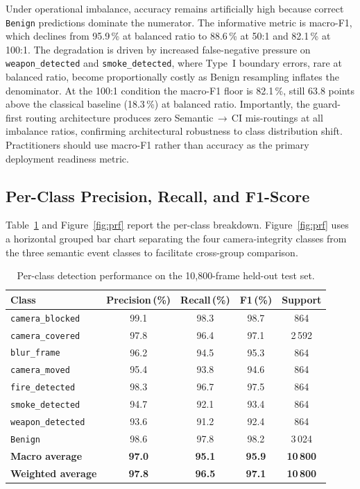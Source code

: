 \documentclass[sensors,article,submit,pdftex,moreauthors]{Definitions/mdpi}
\begin{document}
Under operational imbalance, accuracy remains artificially high because correct \texttt{Benign} predictions dominate the numerator. The informative metric is macro-F1, which declines from 95.9\,\% at balanced ratio to 88.6\,\% at 50:1 and 82.1\,\% at 100:1. The degradation is driven by increased false-negative pressure on \texttt{weapon\_detected} and \texttt{smoke\_detected}, where Type~I boundary errors, rare at balanced ratio, become proportionally costly as Benign resampling inflates the denominator. At the 100:1 condition the macro-F1 floor is 82.1\,\%, still 63.8 points above the classical baseline (18.3\,\%) at balanced ratio. Importantly, the guard-first routing architecture produces zero Semantic$\,\to$\,CI mis-routings at all imbalance ratios, confirming architectural robustness to class distribution shift. Practitioners should use macro-F1 rather than accuracy as the primary deployment readiness metric.
 
 
 
\subsection{Per-Class Precision, Recall, and F1-Score}
\label{sec:perclass}
 
Table~\ref{tab:per-class} and Figure~\ref{fig:prf} report the per-class
breakdown. Figure~\ref{fig:prf} uses a horizontal grouped bar chart
separating the four camera-integrity classes from the three semantic event
classes to facilitate cross-group comparison.
 
\begin{table}[H]
\caption{Per-class detection performance on the 10{,}800-frame held-out test set.}
\label{tab:per-class}
\centering\small\setlength{\tabcolsep}{5pt}
\begin{tabular}{lcccc}
\toprule
\textbf{Class} & \textbf{Precision\,(\%)} & \textbf{Recall\,(\%)} &
\textbf{F1\,(\%)} & \textbf{Support} \\
\midrule
\texttt{camera\_blocked}  & 99.1 & 98.3 & 98.7 & 864 \\
\texttt{camera\_covered}  & 97.8 & 96.4 & 97.1 & 2\,592 \\
\texttt{blur\_frame}      & 96.2 & 94.5 & 95.3 & 864 \\
\texttt{camera\_moved}    & 95.4 & 93.8 & 94.6 & 864 \\
\texttt{fire\_detected}   & 98.3 & 96.7 & 97.5 & 864 \\
\texttt{smoke\_detected}  & 94.7 & 92.1 & 93.4 & 864 \\
\texttt{weapon\_detected} & 93.6 & 91.2 & 92.4 & 864 \\
\texttt{Benign}           & 98.6 & 97.8 & 98.2 & 3\,024 \\
\midrule
\textbf{Macro average}    & \textbf{97.0} & \textbf{95.1} &
\textbf{95.9} & \textbf{10\,800} \\
\textbf{Weighted average} & \textbf{97.8} & \textbf{96.5} &
\textbf{97.1} & \textbf{10\,800} \\
\bottomrule
\end{tabular}
\end{table}
 
\end{document}
